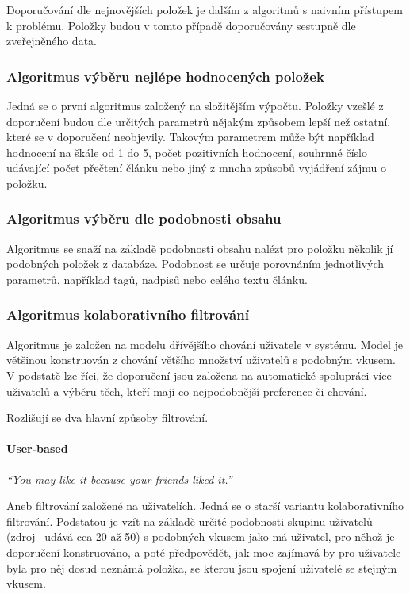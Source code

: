 \documentclass[thesis=M,czech]{FITthesis}[2014/05/07]
\begin{document}
Doporučování dle nejnovějších položek je dalším z algoritmů s naivním přístupem k problému. Položky budou v tomto případě doporučovány sestupně dle zveřejněného data. 

\subsubsection{Algoritmus výběru nejlépe hodnocených položek}

Jedná se o první algoritmus založený na složitějším výpočtu. Položky vzešlé z doporučení budou dle určitých parametrů nějakým způsobem lepší než ostatní, které se v doporučení neobjevily. Takovým parametrem může být například hodnocení na škále od 1 do 5, počet pozitivních hodnocení, souhrnné číslo udávající počet přečtení článku nebo jiný z mnoha způsobů vyjádření zájmu o položku. 

\subsubsection{Algoritmus výběru dle podobnosti obsahu}

Algoritmus se snaží na základě podobnosti obsahu nalézt pro položku několik jí podobných položek z databáze. Podobnost se určuje porovnáním jednotlivých parametrů, například tagů, nadpisů nebo celého textu článku.

\subsubsection{Algoritmus kolaborativního filtrování}

Algoritmus je založen na modelu dřívějšího chování uživatele v systému. Model je většinou konstruován z chování většího množství uživatelů s podobným vkusem. V podstatě lze říci, že doporučení jsou založena na automatické spolupráci více uživatelů a výběru těch, kteří mají co nejpodobnější preference či chování.

Rozlišují se dva hlavní způsoby filtrování.

\paragraph{User-based}

\emph{``You may like it because your friends liked it.''}~\cite{cf}

Aneb filtrování založené na uživatelích. Jedná se o starší variantu kolaborativního filtrování. Podstatou je vzít na základě určité podobnosti skupinu uživatelů (zdroj~\cite{cf} udává cca 20 až 50) s podobných vkusem jako má uživatel, pro něhož je doporučení konstruováno, a poté předpovědět, jak moc zajímavá by pro uživatele byla pro něj dosud neznámá položka, se kterou jsou spojení uživatelé se stejným vkusem.
\end{document}
